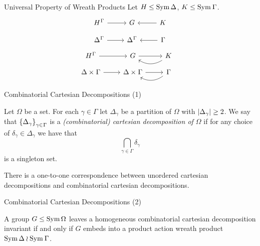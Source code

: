 \begin{frame}{Universal Property of Wreath Products}
    Let $H \leq \operatorname{Sym} \Delta$, $K \leq \sym \Gamma$.
    \[
    \begin{tikzcd}[ampersand replacement=\&, row sep=small]
        H ^ \Gamma
            \ar[r]
        \&
        G
        \&
        K
            \ar[l]
        \\
        \Delta ^ \Gamma
            \ar[r]
        \&
        \Delta ^ \Gamma
        \&
        \Gamma
            \ar[l]
    \end{tikzcd}
    \]
    \pause
    \vspace{1em}
    \[
    \hspace{-1em}
    \begin{tikzcd}[ampersand replacement=\&, row sep=small]
        H ^ \Gamma
            \ar[r]
        \&
        G
            \ar[r]
        \&
        K
            \ar[bend left=33]{l}
        \\
        \Delta \times \Gamma
            \ar[r]
        \&
        \Delta \times \Gamma
            \ar[r]
        \&
        \Gamma
            \ar[bend left=33]{l}
    \end{tikzcd}
    \]
\end{frame}

\begin{frame}{Combinatorial Cartesian Decompositions (1)}
    \begin{defn}
        Let $\Omega$ be a set.
        For each $\gamma \in \Gamma$ let $\Delta_\gamma$ be a partition of
        $\Omega$ with $ \left| \Delta_\gamma \right|  \geq 2$.
        We say that $\set{ \Delta_\gamma }_{\gamma \in \Gamma}$ is a
        \emph{(combinatorial) cartesian decomposition of $\Omega$}
        if
        \pause
        for any choice of $\delta_\gamma \in \Delta_\gamma$
        we have that
        \[
            \bigcap_{\gamma \in \Gamma} \delta_\gamma
        \]
        is a singleton set.
    \end{defn}
    \pause

    \begin{lemma}
        There is a one-to-one correspondence between
        unordered cartesian decompositions
        and combinatorial cartesian decompositions.
    \end{lemma}
\end{frame}

\begin{frame}{Combinatorial Cartesian Decompositions (2)}
    \begin{thm}
        A group $G \leq \operatorname{Sym} \Omega$ leaves a homogeneous combinatorial
        cartesian decomposition invariant
        if and only if
        $G$ embeds into a product action wreath product
        $\sym \Delta \wr \sym \Gamma$.
    \end{thm}
\end{frame}
